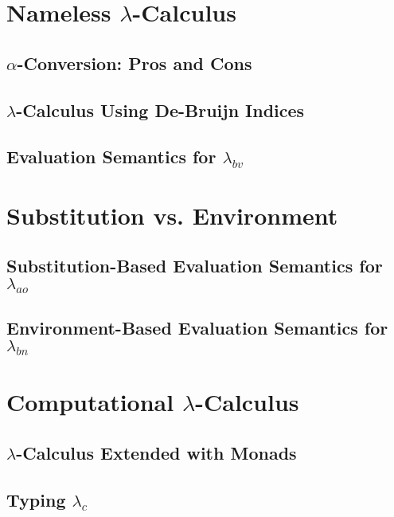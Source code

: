 \documentclass[a4paper,12pt]{article}
\begin{document}
\section{Nameless $\lambda$-Calculus}

\subsection{$\alpha$-Conversion: Pros and Cons}

\subsection{$\lambda$-Calculus Using De-Bruijn Indices}

\subsection{Evaluation Semantics for $\lambda_{bv}$}

\section{Substitution vs. Environment}

\subsection{Substitution-Based Evaluation Semantics for $\lambda_{ao}$}

\subsection{Environment-Based Evaluation Semantics for $\lambda_{bn}$}

\section{Computational $\lambda$-Calculus}

\subsection{$\lambda$-Calculus Extended with Monads}

\subsection{Typing $\lambda_c$}
\end{document}
